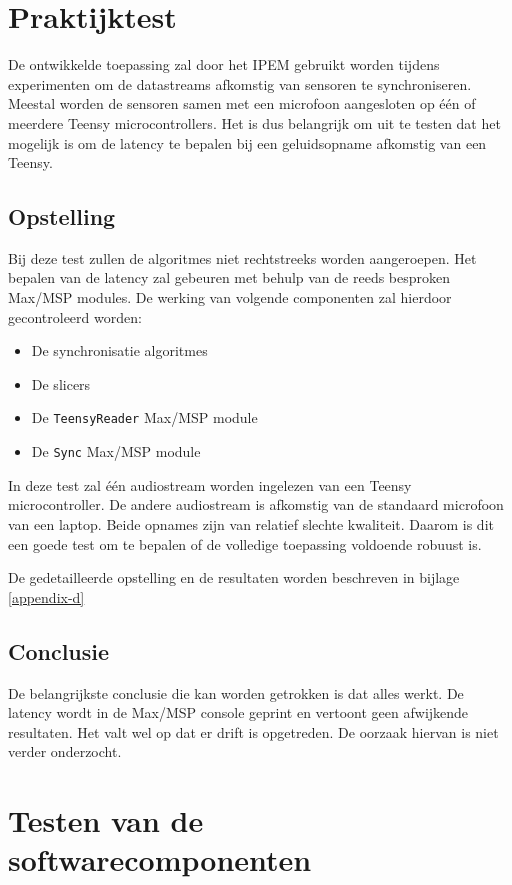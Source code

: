 \section{Praktijktest}
\label{praktijktest}

De ontwikkelde toepassing zal door het IPEM gebruikt worden tijdens experimenten om de datastreams afkomstig van sensoren te synchroniseren. Meestal worden de sensoren samen met een microfoon aangesloten op één of meerdere Teensy microcontrollers. Het is dus belangrijk om uit te testen dat het mogelijk is om de latency te bepalen bij een geluidsopname afkomstig van een Teensy.

\subsection{Opstelling}

Bij deze test zullen de algoritmes niet rechtstreeks worden aangeroepen. Het bepalen van de latency zal gebeuren met behulp van de reeds besproken Max/MSP modules. De werking van volgende componenten zal hierdoor gecontroleerd worden:
\begin{itemize}[noitemsep]
	\item De synchronisatie algoritmes
	\item De slicers
	\item De \texttt{TeensyReader} Max/MSP module
	\item De \texttt{Sync} Max/MSP module
\end{itemize}

In deze test zal één audiostream worden ingelezen van een Teensy microcontroller. De andere audiostream is afkomstig van de standaard microfoon van een laptop. Beide opnames zijn van relatief slechte kwaliteit. Daarom is dit een goede test om te bepalen of de volledige toepassing voldoende robuust is.

De gedetailleerde opstelling en de resultaten worden beschreven in bijlage \ref{appendix-d}

\subsection{Conclusie}

De belangrijkste conclusie die kan worden getrokken is dat alles werkt. De latency wordt in de Max/MSP console geprint en vertoont geen afwijkende resultaten. Het valt wel op dat er drift is opgetreden. De oorzaak hiervan is niet verder onderzocht. 

\section{Testen van de softwarecomponenten}

